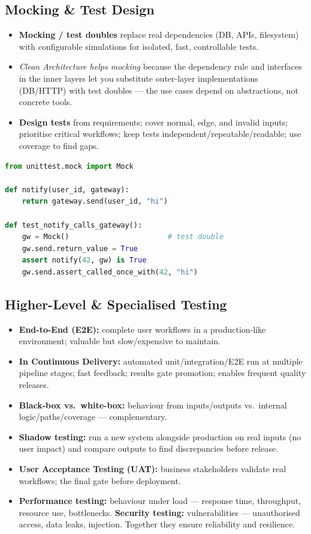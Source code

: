 \documentclass[hidelinks]{article}
\begin{document}
\subsection{Mocking \& Test Design}
\begin{itemize}
  \item \textbf{Mocking / test doubles} replace real dependencies (DB, APIs, filesystem) with
        configurable simulations for isolated, fast, controllable tests.
  \item \emph{Clean Architecture helps mocking} because the dependency rule and interfaces in the
        inner layers let you substitute outer-layer implementations (DB/HTTP) with test doubles ---
        the use cases depend on abstractions, not concrete tools.
  \item \textbf{Design tests} from requirements; cover normal, edge, and invalid inputs; prioritise
        critical workflows; keep tests independent/repeatable/readable; use coverage to find gaps.
\end{itemize}

\begin{lstlisting}[language=Python,caption={Unit test with a mock (pytest) (added)}]
from unittest.mock import Mock

def notify(user_id, gateway):
    return gateway.send(user_id, "hi")

def test_notify_calls_gateway():
    gw = Mock()                       # test double
    gw.send.return_value = True
    assert notify(42, gw) is True
    gw.send.assert_called_once_with(42, "hi")
\end{lstlisting}

\subsection{Higher-Level \& Specialised Testing}
\begin{itemize}
  \item \textbf{End-to-End (E2E):} complete user workflows in a production-like environment;
        valuable but slow/expensive to maintain.
  \item \textbf{In Continuous Delivery:} automated unit/integration/E2E run at multiple pipeline
        stages; fast feedback; results gate promotion; enables frequent quality releases.
  \item \textbf{Black-box vs.\ white-box:} behaviour from inputs/outputs vs.\ internal
        logic/paths/coverage --- complementary.
  \item \textbf{Shadow testing:} run a new system alongside production on real inputs (no user
        impact) and compare outputs to find discrepancies before release.
  \item \textbf{User Acceptance Testing (UAT):} business stakeholders validate real workflows; the
        final gate before deployment.
  \item \textbf{Performance testing:} behaviour under load --- response time, throughput, resource
        use, bottlenecks. \textbf{Security testing:} vulnerabilities --- unauthorised access, data
        leaks, injection. Together they ensure reliability and resilience.
\end{itemize}
\end{document}
